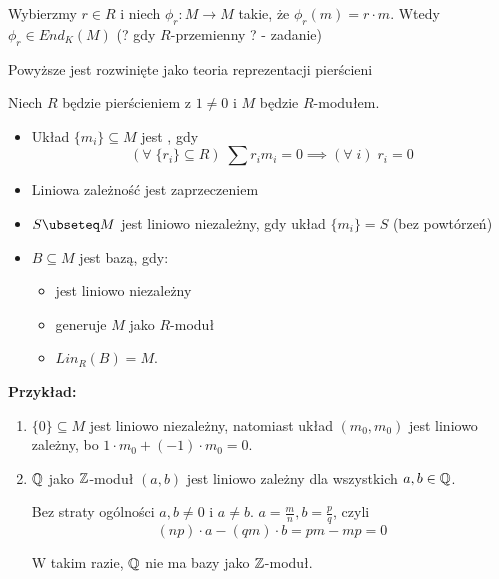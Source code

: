 Wybierzmy $r\in R$ i niech $\phi_r:M\to M$ takie, że $\phi_r(m)=r\cdot m$. Wtedy $\phi_r\in End_K(M)$ (? gdy $R$-przemienny ? - zadanie)

\begin{center}\end{center}

Powyższe jest rozwinięte jako teoria reprezentacji pierścieni

\begin{bbox}
Niech $R$ będzie pierścieniem z $1\neq 0$ i $M$ będzie $R$-modułem.

\begin{itemize}%
    \item[\PHtunny] Układ $\{m_i\}\subseteq M$ jest , gdy
    $$(\forall\;\{r_i\}\subseteq R)\;\sum r_im_i=0\implies(\forall\;i)\;r_i=0$$
    \item[\PHtunny] Liniowa zależność jest zaprzeczeniem
    \item[\PHtunny] $S\ubseteq M$ jest liniowo niezależny, gdy układ $\{m_i\}=S$ (bez powtórzeń)
    \item[\PHtunny] $B\subseteq M$ jest bazą, gdy:
    \begin{itemize}
        \item jest liniowo niezależny
        \item generuje $M$ jako $R$-moduł
        \item $Lin_R(B)=M$.
    \end{itemize}
\end{itemize}

\end{bbox}

\textbf{Przykład:}

\begin{enumerate}
    \item $\{0\}\subseteq M$ jest liniowo niezależny, natomiast układ $(m_0,m_0)$ jest liniowo zależny, bo $1\cdot m_0+(-1)\cdot m_0=0$.
    \item $\mathbb{Q}$ jako $\mathbb{Z}$-moduł $(a, b)$ jest liniowo zależny dla wszystkich $a,b\in\mathbb{Q}$.

    Bez straty ogólności $a,b\neq 0$ i $a\neq b$. $a=\frac{m}{n},b=\frac{p}{q}$, czyli
    $$(np)\cdot a-(qm)\cdot b=pm-mp=0$$

    W takim razie, $\mathbb{Q}$ nie ma bazy jako $\mathbb{Z}$-moduł.
\end{enumerate}

